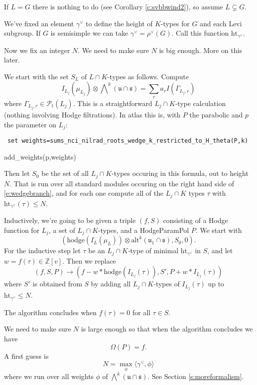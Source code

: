 \documentclass[12pt,leqno]{article}
\newcommand{\hodge}{\text{hodge}}
\newcommand{\height}{\text{ht}}
\newcommand\Pt{\mathcal P_t}
\newcommand{\alt}{\text{alt}}
\newcommand{\Z}{\mathbb Z}
\renewcommand{\u}{\mathfrak u}
\newcommand{\ch}[1]{#1^\vee}
\newcommand{\s}{\mathfrak s}
\begin{document}
If $L=G$ there is nothing to do (see Corollary \ref{c:svbbwind2}), so assume $L\subsetneq G$.

We've fixed an element $\ch\gamma$ to define the height of $K$-types
for $G$ and each Levi subgroup. If $G$ is semisimple we can take
$\ch\gamma=\ch\rho(G)$. Call this function $\height_{\ch\gamma}$.





Now we fix an integer $N$. We need to make sure $N$ is big enough. More on this later.

We start with the set $S_L$ of $L\cap K$-types as follows. Compute
\begin{equation}
\label{e:wedgebranch}
I_{L_j}(\mu_{L_j})\otimes\bigwedge\nolimits^k(\u\cap\s)
=
\sum_r a_r I(\Gamma_{L_j,r})
\end{equation}
where $\Gamma_{L_j,r}\in \Pt(L_j)$. This is a straightforward
$L_j\cap K$-type calculation (nothing involving Hodge filtrations). In atlas
this is, with $P$ the parabolic and $p$ the parameter on $L_j$:
\medskip


{\tt
  set weights=sums\_nci\_nilrad\_roots\_wedge\_k\_restricted\_to\_H\_theta(P,k)

  add\_weights(p,weights)
}

\medskip

Then let $S_0$ be the set of all $L_j\cap K$-types occuring in this
formula, out to height $N$.  That is run over all standard modules
occuring on the right hand side of \eqref{e:wedgebranch}, and for each
one compute all of the $L_j\cap K$ types $\tau$ with $\height_{\ch\gamma}(\tau)\le
N$.

Inductively, we're going to be given a triple $(f,S)$ consisting of
a Hodge function for $L_j$, a set of $L_j\cap K$-types, and a
HodgeParamPol $P$.
We start with
$$
(\hodge(I_L(\mu_L))\otimes\alt^k(\u_1\cap\s),S_0,0).
$$
For the
inductive step let $\tau$ be an $L_j\cap K$-type of minimal
$\height_{\ch\gamma}$ in $S$, and let $w=f(\tau)\in\Z[v]$.
Then we replace
$$
(f,S,P)\longrightarrow (f-w*\hodge(I_{L_j}(\tau)),S',P+w*I_{L_j}(\tau))
$$
where
$S'$ is obtained from $S$ by adding all $L_j\cap K$-types of
$I_{L_j}(\tau)$ up to $\height_{\ch\gamma}\le N$.

The algorithm concludes when $f(\tau)=0$ for all $\tau\in S$.

We need to make sure $N$ is large enough so that when the algorithm
concludes we have
$$
\Omega(P)=f.
$$
A first guess is
$$
N=\max_{\phi}\langle \ch\gamma,\phi\rangle
$$
where we run over all weights $\phi$ of $\bigwedge^k(\u\cap\s)$.
See Section \ref{s:moreformalism}.
\bigskip
\end{document}
